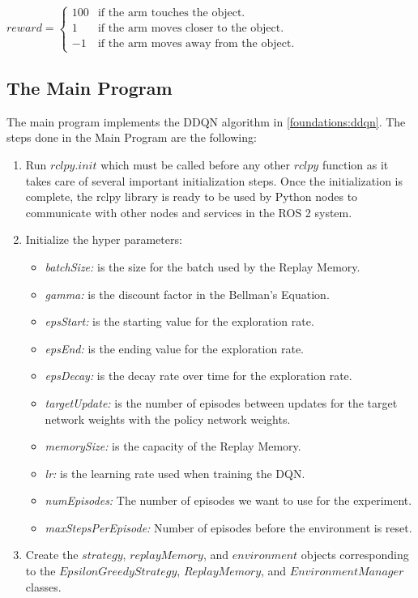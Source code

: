 \documentclass[12pt,oneside]{article}
\begin{document}
\begin{enumerate}
$reward = 
 \begin{cases} 
 	100 	& \text{if the arm touches the object.} \\ 
 	1 		& \text{if the arm moves closer to the object.} \\ 
 	-1 		& \text{if the arm moves away from the object.} 
 \end{cases}$
\end{enumerate}


\subsection{The Main Program}\label{main-program}
The main program implements the DDQN algorithm in \ref{foundations:ddqn}. The steps done in the Main Program are the following:
\begin{enumerate}
\item Run $rclpy.init$ which must be called before any other $rclpy$ function as it takes care of several important initialization steps. Once the initialization is complete, the rclpy library is ready to be used by Python nodes to communicate with other nodes and services in the ROS 2 system.
\item  Initialize the hyper parameters:
\begin{itemize}
\item \textit{batchSize:} is the size for the batch used by the Replay Memory.
\item \textit{gamma:} is the discount factor in the Bellman's Equation.
\item \textit{epsStart:} is the starting value for the exploration rate.
\item \textit{epsEnd: } is the ending value for the exploration rate.
\item \textit{epsDecay:} is the decay rate over time for the exploration rate.
\item \textit{targetUpdate:} is the number of episodes between updates for the target network weights with the policy network weights.
\item \textit{memorySize:} is the capacity of the Replay Memory.
\item \textit{lr:} is the learning rate used when training the DQN.
\item \textit{numEpisodes:} The number of episodes we want to use for the experiment.
\item \textit{maxStepsPerEpisode:} Number of episodes before the environment is reset.
\end{itemize}
\item Create the $strategy$, $replayMemory$, and $environment$ objects corresponding to the $EpsilonGreedyStrategy$, $ReplayMemory$, and $EnvironmentManager$ classes.

\end{enumerate}
\end{document}
